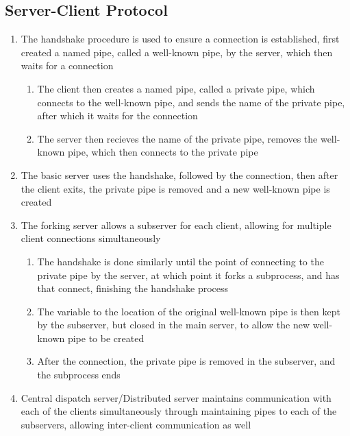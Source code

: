 \documentclass[11 pt, twoside]{article}
\begin{document}
\begin{enumerate}
\subsection{Server-Client Protocol}
\begin{enumerate}
\item The handshake procedure is used to ensure a connection is established, first created a named pipe, called a well-known pipe, by the server, which then waits for a connection
\begin{enumerate}
\item The client then creates a named pipe, called a private pipe, which connects to the well-known pipe, and sends the name of the private pipe, after which it waits for the connection
\item The server then recieves the name of the private pipe, removes the well-known pipe, which then connects to the private pipe
\end{enumerate}
\item The basic server uses the handshake, followed by the connection, then after the client exits, the private pipe is removed and a new well-known pipe is created
\item The forking server allows a subserver for each client, allowing for multiple client connections simultaneously
\begin{enumerate}
\item The handshake is done similarly until the point of connecting to the private pipe by the server, at which point it forks a subprocess, and has that connect, finishing the handshake process
\item The variable to the location of the original well-known pipe is then kept by the subserver, but closed in the main server, to allow the new well-known pipe to be created
\item After the connection, the private pipe is removed in the subserver, and the subprocess ends
\end{enumerate}
\item Central dispatch server/Distributed server maintains communication with each of the clients simultaneously through maintaining pipes to each of the subservers, allowing inter-client communication as well
\end{enumerate}


\end{enumerate}
\end{document}
